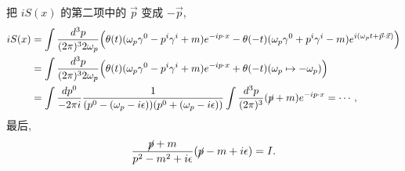 \begin{itemize}
\begin{tcolorbox}[title=calculation:]
		把 $i S(x)$ 的第二项中的 $\vec{p}$ 变成 $- \vec{p}$,
		\begin{align}
			i S(x) &= \int \frac{d^3 p}{(2 \pi)^3 2 \omega_p} \Big( \theta(t) (\omega_p \gamma^0 - p^i \gamma^i + m) e^{- i p \cdot x} - \theta(- t) (\omega_p \gamma^0 + p^i \gamma^i - m) e^{i (\omega_p t + \vec{p} \cdot \vec{x})} \Big) \notag \\
			&= \int \frac{d^3 p}{(2 \pi)^3 2 \omega_p} \Big( \theta(t) (\omega_p \gamma^0 - p^i \gamma^i + m) e^{- i p \cdot x} + \theta(- t) (\omega_p \mapsto - \omega_p) \Big) \notag \\
			&= \int \frac{dp^0}{- 2 \pi i} \frac{1}{(p^0 - (\omega_p - i \epsilon)) (p^0 + (\omega_p - i \epsilon))} \int \frac{d^3 p}{(2 \pi)^3} (\cancel{p} + m) e^{- i p \cdot x} = \cdots,
		\end{align}
		最后,
		\begin{equation}
			\frac{\cancel{p} + m}{p^2 - m^2 + i \epsilon} (\cancel{p} - m + i \epsilon) = I.
		\end{equation}
	\end{tcolorbox}
\end{itemize}
